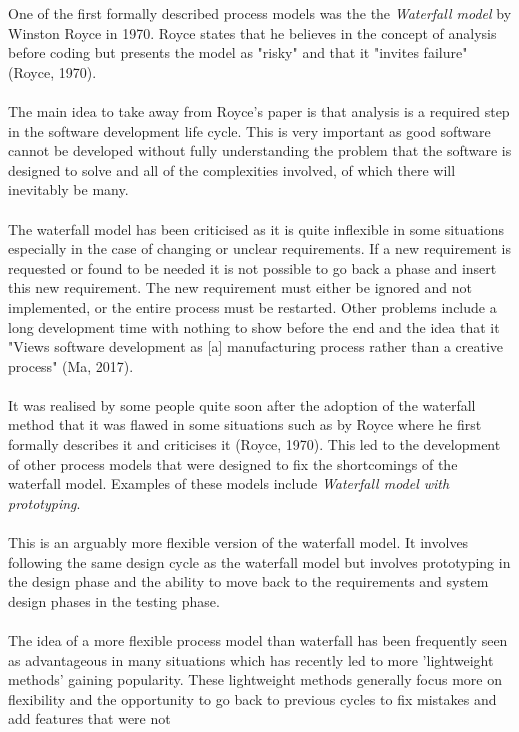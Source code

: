 \documentclass{CRPITStyle}
\begin{document}
		One of the first formally described process models was the the \textit{Waterfall model} by Winston Royce in 1970.
		Royce states that he believes in the concept of analysis before coding but presents the model as "risky" and that it
		"invites failure" (Royce, 1970).\\
		~\\
		The main idea to take away from Royce's paper is that analysis is a required step in the software development life cycle.
		This is very important as good software cannot be developed without fully understanding the problem that the software
		is designed to solve and all of the complexities involved, of which there will inevitably be many.\\
		~\\
		The waterfall model has been criticised as it is quite inflexible in some situations especially in the case of changing
		or unclear requirements. If a new requirement is requested or found to be needed it is not possible to go back a phase
		and insert this new requirement. The new requirement must either be ignored and not implemented, or the entire
		process must be restarted. Other problems include a long development time with nothing to show before the end and
		the idea that it "Views software development as [a] manufacturing process rather than a creative process" (Ma, 2017).\\
		~\\
		It was realised by some people quite soon after the adoption of the waterfall method that it was flawed in some 
		situations such as by Royce where he first formally describes it and criticises it (Royce, 1970). This led to the
		development of other process models that were designed to fix the shortcomings of the waterfall model. Examples of
		these models include \textit{Waterfall model with prototyping}. \\
		~\\
		 This is an arguably more flexible version of the waterfall model. It involves following the same
		 design cycle as the waterfall model but involves prototyping in the design phase
		and the ability to move back to the requirements and system design phases in the testing phase.\\
		~\\
		The idea of a more flexible process model than waterfall has been frequently seen as advantageous in many situations
		which has recently led to more 'lightweight methods' gaining popularity. These lightweight methods generally focus 
		more on flexibility and the opportunity to go back to previous cycles to fix mistakes and add features that were not
\end{document}
